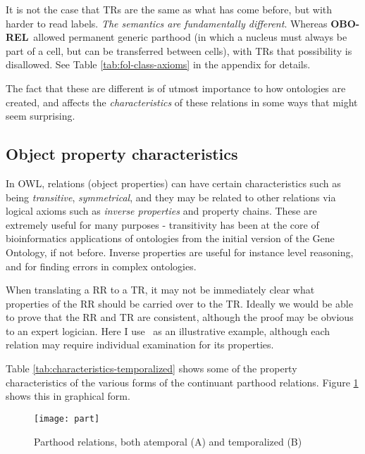 \documentclass{bioinfo}
\def\partOf{\pr{part\_of}}
\def\OBOREL{\textbf{OBO-REL}}
\begin{document}
It is not the case that TRs are the same as what has come before, but
with harder to read labels. \emph{The semantics are fundamentally
  different}. Whereas \OBOREL\ allowed permanent generic parthood (in
which a nucleus must always be part of a cell, but can be transferred
between cells), with TRs that possibility is disallowed. See Table
\ref{tab:fol-class-axioms} in the appendix for details.

The fact that these are different is of utmost importance to how
ontologies are created, and affects the \emph{characteristics} of
these relations in some ways that might seem surprising.

\subsection{Object property characteristics}

In OWL, relations (object properties) can have certain characteristics
such as being \emph{transitive}, \emph{symmetrical}, and they may be
related to other relations via logical axioms such as \emph{inverse
  properties} and property chains. These are extremely useful for many
purposes - transitivity has been at the core of bioinformatics
applications of ontologies from the initial version of the Gene
Ontology\cite{Ashburner2000}, if not before. Inverse properties are
useful for instance level reasoning, and for finding errors in complex
ontologies.

When translating a RR to a TR, it may not be immediately clear what
properties of the RR should be carried over to the TR. Ideally we
would be able to prove that the RR and TR are consistent, although the
proof may be obvious to an expert logician. Here I use \partOf\ as an
illustrative example, although each relation may require individual
examination for its properties.

Table \ref{tab:characteristics-temporalized} shows some of the
property characteristics of the various forms of the continuant
parthood relations. Figure \ref{fig:part} shows this in graphical
form.

\begin{figure}
\center
\texttt{[image: part]}
\caption{Parthood relations, both atemporal (A) and temporalized (B)}
\label{fig:part}
\end{figure}
\end{document}
